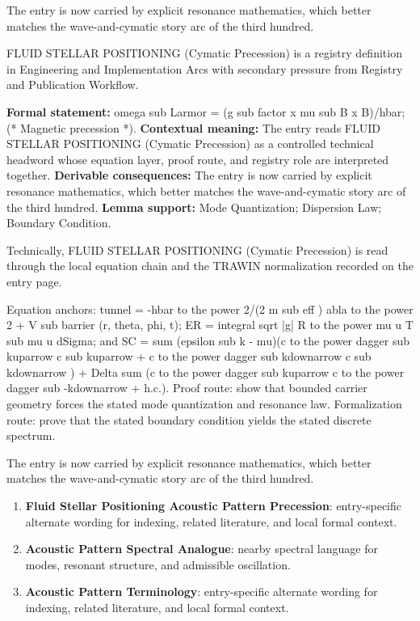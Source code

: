 The entry is now carried by explicit resonance mathematics, which better matches the wave-and-cymatic story arc of the third hundred.
\clearpage


\begingroup\small
{}
FLUID STELLAR POSITIONING (Cymatic Precession) is a registry definition in Engineering and Implementation Arcs with secondary pressure from Registry and Publication Workflow.

\begingroup\footnotesize\setlength{\emergencystretch}{3em}\sloppy
\textbf{Formal statement:} omega sub Larmor = (g sub factor x mu sub B x B)/hbar; (* Magnetic precession *). \textbf{Contextual meaning:} The entry reads FLUID STELLAR POSITIONING (Cymatic Precession) as a controlled technical headword whose equation layer, proof route, and registry role are interpreted together. \textbf{Derivable consequences:} The entry is now carried by explicit resonance mathematics, which better matches the wave-and-cymatic story arc of the third hundred. \textbf{Lemma support:} Mode Quantization; Dispersion Law; Boundary Condition.\par
\endgroup

Technically, FLUID STELLAR POSITIONING (Cymatic Precession) is read through the local equation chain and the TRAWIN normalization recorded on the entry page.

Equation anchors:  tunnel = -hbar to the power 2/(2 m sub eff ) abla to the power 2 + V sub barrier (r, theta, phi, t);  ER = integral sqrt |g| R to the power mu u T sub mu u dSigma; and  SC = sum (epsilon sub k - mu)(c to the power dagger sub kuparrow c sub kuparrow + c to the power dagger sub kdownarrow c sub kdownarrow ) + Delta sum (c to the power dagger sub kuparrow c to the power dagger sub -kdownarrow + h.c.). Proof route: show that bounded carrier geometry forces the stated mode quantization and resonance law. Formalization route: prove that the stated boundary condition yields the stated discrete spectrum.

The entry is now carried by explicit resonance mathematics, which better matches the wave-and-cymatic story arc of the third hundred.
\endgroup

\begin{enumerate}[leftmargin=1.6em,itemsep=6pt,topsep=4pt]
\item \textbf{Fluid Stellar Positioning Acoustic Pattern Precession}: entry-specific alternate wording for indexing, related literature, and local formal context.
\item \textbf{Acoustic Pattern Spectral Analogue}: nearby spectral language for modes, resonant structure, and admissible oscillation.
\item \textbf{Acoustic Pattern Terminology}: entry-specific alternate wording for indexing, related literature, and local formal context.
\end{enumerate}

